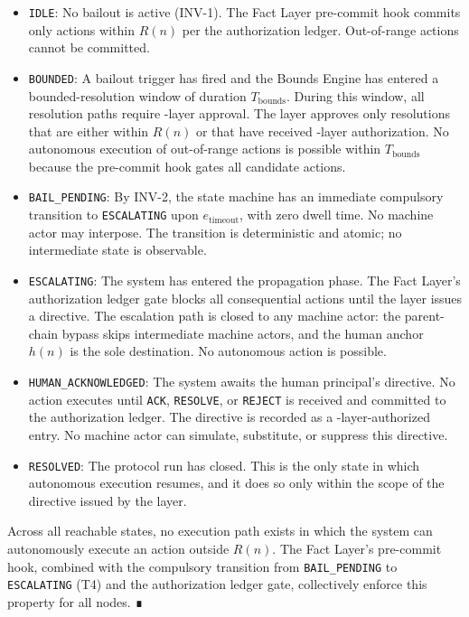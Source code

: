 \begin{itemize}
\item \texttt{IDLE}: No bailout is active (INV-1). The Fact Layer pre-commit hook commits only actions within $R(n)$ per the authorization ledger. Out-of-range actions cannot be committed.

\item \texttt{BOUNDED}: A bailout trigger has fired and the Bounds Engine has entered a bounded-resolution window of duration $T_{\text{bounds}}$. During this window, all resolution paths require \fact-layer approval. The \fact{} layer approves only resolutions that are either within $R(n)$ or that have received \purpose-layer authorization. No autonomous execution of out-of-range actions is possible within $T_{\text{bounds}}$ because the pre-commit hook gates all candidate actions.

\item \texttt{BAIL\_PENDING}: By INV-2, the state machine has an immediate compulsory transition to \texttt{ESCALATING} upon $e_{\text{timeout}}$, with zero dwell time. No machine actor may interpose. The transition is deterministic and atomic; no intermediate state is observable.

\item \texttt{ESCALATING}: The system has entered the propagation phase. The Fact Layer's authorization ledger gate blocks all consequential actions until the \purpose{} layer issues a directive. The escalation path is closed to any machine actor: the parent-chain bypass skips intermediate machine actors, and the human anchor $h(n)$ is the sole destination. No autonomous action is possible.

\item \texttt{HUMAN\_ACKNOWLEDGED}: The system awaits the human principal's directive. No action executes until \texttt{ACK}, \texttt{RESOLVE}, or \texttt{REJECT} is received and committed to the authorization ledger. The directive is recorded as a \purpose-layer-authorized entry. No machine actor can simulate, substitute, or suppress this directive.

\item \texttt{RESOLVED}: The protocol run has closed. This is the only state in which autonomous execution resumes, and it does so only within the scope of the directive issued by the \purpose{} layer.
\end{itemize}

Across all reachable states, no execution path exists in which the system can autonomously execute an action outside $R(n)$. The Fact Layer's pre-commit hook, combined with the compulsory transition from \texttt{BAIL\_PENDING} to \texttt{ESCALATING} (T4) and the authorization ledger gate, collectively enforce this property for all nodes. ∎

